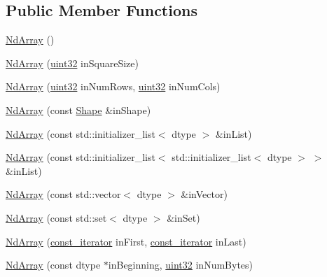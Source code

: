 \subsection*{Public Member Functions}
\begin{DoxyCompactItemize}
\item 
\mbox{\hyperlink{class_num_c_1_1_nd_array_a4c4327e80cf320d9e634462e3f58b7b5}{Nd\+Array}} ()
\item 
\mbox{\hyperlink{class_num_c_1_1_nd_array_abe77a5faaf421f07b4fd08228fc7214b}{Nd\+Array}} (\mbox{\hyperlink{namespace_num_c_ae685802ca6d3035f2b400b081e3953fa}{uint32}} in\+Square\+Size)
\item 
\mbox{\hyperlink{class_num_c_1_1_nd_array_a18907a1e1a932dea4d133656c765a2c8}{Nd\+Array}} (\mbox{\hyperlink{namespace_num_c_ae685802ca6d3035f2b400b081e3953fa}{uint32}} in\+Num\+Rows, \mbox{\hyperlink{namespace_num_c_ae685802ca6d3035f2b400b081e3953fa}{uint32}} in\+Num\+Cols)
\item 
\mbox{\hyperlink{class_num_c_1_1_nd_array_abfb0bb5fe5fc12c2c0aa66c0c403278f}{Nd\+Array}} (const \mbox{\hyperlink{class_num_c_1_1_shape}{Shape}} \&in\+Shape)
\item 
\mbox{\hyperlink{class_num_c_1_1_nd_array_a4ecc3daedaeb2adfb84ae8e5f787e28a}{Nd\+Array}} (const std\+::initializer\+\_\+list$<$ dtype $>$ \&in\+List)
\item 
\mbox{\hyperlink{class_num_c_1_1_nd_array_ab61e6e97567dfd64044e7de9f532e2be}{Nd\+Array}} (const std\+::initializer\+\_\+list$<$ std\+::initializer\+\_\+list$<$ dtype $>$ $>$ \&in\+List)
\item 
\mbox{\hyperlink{class_num_c_1_1_nd_array_a57378e996158f31c5be873eca046109c}{Nd\+Array}} (const std\+::vector$<$ dtype $>$ \&in\+Vector)
\item 
\mbox{\hyperlink{class_num_c_1_1_nd_array_acbe7b33c1cea9849ea292e91becd833b}{Nd\+Array}} (const std\+::set$<$ dtype $>$ \&in\+Set)
\item 
\mbox{\hyperlink{class_num_c_1_1_nd_array_a27533d2cbbffc8572e42c17027f5b2f1}{Nd\+Array}} (\mbox{\hyperlink{class_num_c_1_1_nd_array_a445cec326684b0066bddae07ba06eddf}{const\+\_\+iterator}} in\+First, \mbox{\hyperlink{class_num_c_1_1_nd_array_a445cec326684b0066bddae07ba06eddf}{const\+\_\+iterator}} in\+Last)
\item 
\mbox{\hyperlink{class_num_c_1_1_nd_array_aeddcb74a88d62e836396af0e807d44c1}{Nd\+Array}} (const dtype $\ast$in\+Beginning, \mbox{\hyperlink{namespace_num_c_ae685802ca6d3035f2b400b081e3953fa}{uint32}} in\+Num\+Bytes)
\item 

\end{DoxyCompactItemize}
